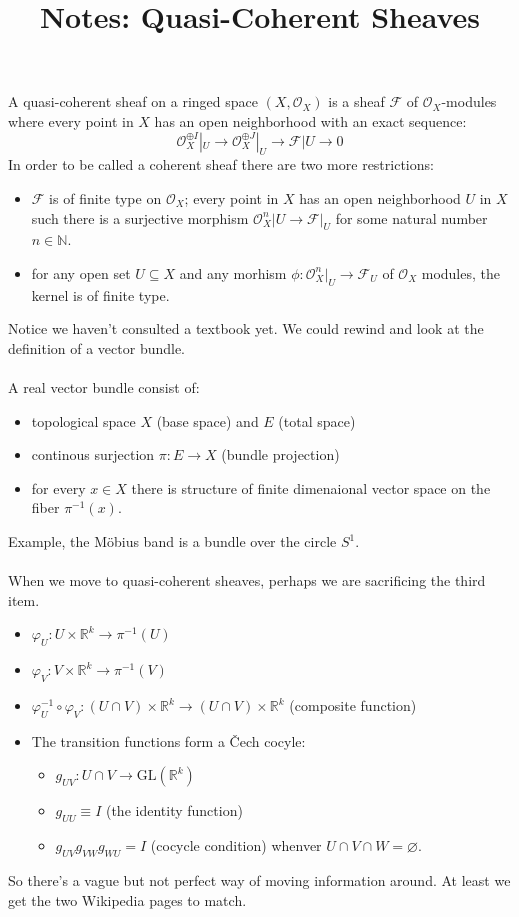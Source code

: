 \documentclass[12pt]{article}
\title{Notes: Quasi-Coherent Sheaves}
\date{}
\begin{document}
\sffamily

\maketitle

{\fontsize{16pt}{16pt}\selectfont 


\noindent A quasi-coherent sheaf on a ringed space $(X, \mathcal{O}_X)$ is a sheaf $\mathcal{F}$ of $\mathcal{O}_X$-modules where every point in $X$ has an open neighborhood with an exact sequence:
$$ \mathcal{O}_X^{\oplus I}|_U \to \mathcal{O}_X^{\oplus J}|_U \to \mathcal{F}|U \to 0 $$
In order to be called a coherent sheaf there are two more restrictions:
\begin{itemize}
\item $\mathcal{F}$ is of finite type on $\mathcal{O}_X$; every point in $X$ has an open neighborhood $U$ in $X$ such there is a surjective morphism $\mathcal{O}^n_X|U \to \mathcal{F}|_U$ for some natural number $n \in \mathbb{N}$. 
\item for any open set $U \subseteq X$ and any morhism $\phi: \mathcal{O}^n_X|_U \to \mathcal{F}_U$ of $\mathcal{O}_X$ modules, the kernel is of finite type.
\end{itemize} 
Notice we haven't consulted a textbook yet.  We could rewind and look at the definition of a vector bundle. \\ \\ 
A real vector bundle consist of:
\begin{itemize}
	\item topological space $X$ (base space) and $E$ (total space)
	\item continous surjection $\pi: E \to X$ (bundle projection)
	\item for every $x \in X$ there is structure of finite dimenaional vector space on the fiber $\pi^{-1}(x)$.
\end{itemize}
Example, the M\"{o}bius band is a bundle over the circle $S^1$. \\ \\
When we move to quasi-coherent sheaves, perhaps we are sacrificing the third item.  
\begin{itemize}
\item $\varphi_U: U \times \mathbb{R}^k \to \pi^{-1}(U) $
\item $\varphi_V: V \times \mathbb{R}^k \to \pi^{-1}(V) $
\item $\varphi^{-1}_U \circ \varphi_V: (U \cap V) \times \mathbb{R}^k \to (U \cap V) \times \mathbb{R}^k $ (composite function)
\item The transition functions form a \v{C}ech cocyle:
\begin{itemize}
\item $g_{UV}: U \cap V \to \text{GL}(\mathbb{R}^k)$
\item $g_{UU} \equiv I$ (the identity function)
\item $g_{UV}g_{VW}g_{WU} = I$ (cocycle condition) whenver $U \cap V \cap W = \varnothing$.
\end{itemize}
\end{itemize}
So there's a vague but not perfect way of moving information around.  At least we get the two Wikipedia pages to match.

}
\end{document}
